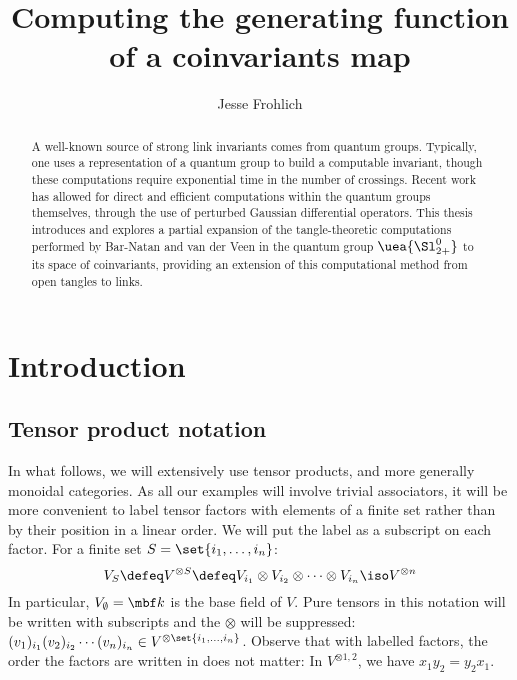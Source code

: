 \documentclass{article}
\title{Computing the generating function of a coinvariants map}
\author{Jesse Frohlich}
\begin{document}
\maketitle

\begin{abstract}
        A well-known source of strong link invariants comes from quantum groups.
        Typically, one uses a representation of a quantum group to build a
        computable invariant, though these computations require exponential time
        in the number of crossings. Recent work has allowed for direct and
        efficient computations within the quantum groups themselves, through the
        use of perturbed Gaussian differential operators. This thesis introduces
        and explores a partial expansion of the tangle-theoretic computations
        performed by Bar-Natan and van der Veen \cite{BV} in the quantum group
        $\uea{\Sl_{2+}^0}$ to its space of coinvariants, providing an extension
        of this computational method from open tangles to links.

\end{abstract}

\newpage

\tableofcontents

\section{Introduction}

\subsection{Tensor product notation}
In what follows, we will extensively use tensor products, and more generally
monoidal categories. As all our examples will involve trivial associators, it
will be more convenient to label tensor factors with elements of a finite set
rather than by their position in a linear order. We will put the label as a
subscript on each factor. For a finite set $S = \set{i_1, \dots, i_n}$:
\begin{equation}\label{eq:tensor_notation}
        V_S \defeq
        V^{\otimes S} \defeq
        V_{i_1}\otimes V_{i_2}\otimes\dots\otimes V_{{i_n}} \iso V^{\otimes n}
\end{equation}
In particular, $V_{\emptyset} = \k$ is the base field of $V$.
Pure tensors in this notation will be written with subscripts and the $\otimes$
will be suppressed:
$(v_1)_{i_1}(v_2)_{i_2}\cdots(v_n)_{i_n} \in V^{\otimes\set{i_1,\dots,i_n}}$.
Observe that with labelled factors, the order the factors are written in does
not matter: In $V^{\otimes{1,2}}$, we have $x_1y_2 = y_2x_1$.
\end{document}
